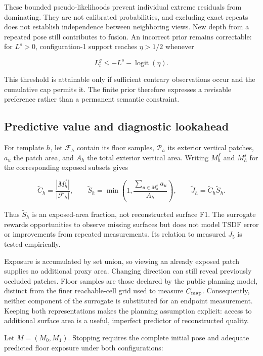 \documentclass[pdflatex,sn-mathphys-num]{sn-jnl}
\begin{document}
These bounded pseudo-likelihoods prevent individual extreme residuals from dominating. They are not calibrated probabilities, and excluding exact repeats does not establish independence between neighboring views. New depth from a repeated pose still contributes to fusion. An incorrect prior remains correctable: for \(L^s>0\), configuration-1 support reaches \(\eta>1/2\) whenever

\[
L_t^g\le-L^s-\operatorname{logit}(\eta).
\]

This threshold is attainable only if sufficient contrary observations occur and the cumulative cap permits it. The finite prior therefore expresses a revisable preference rather than a permanent semantic constraint.

\hypertarget{predictive-value-and-diagnostic-lookahead}{%
\subsection{Predictive value and diagnostic lookahead}\label{predictive-value-and-diagnostic-lookahead}}

For template \(h\), let \(\mathcal F_h\) contain its floor samples, \(\mathcal P_h\) its exterior vertical patches, \(a_u\) the patch area, and \(A_h\) the total exterior vertical area. Writing \(M_h^f\) and \(M_h^s\) for the corresponding exposed subsets gives

\[
\widetilde C_h=\frac{|M_h^f|}{|\mathcal F_h|},\qquad
\widetilde S_h=\min\left(1,\frac{\sum_{u\in M_h^s}a_u}{A_h}\right),\qquad
\widetilde J_h=\widetilde C_h\widetilde S_h.
\]

Thus \(\widetilde S_h\) is an exposed-area fraction, not reconstructed surface F1. The surrogate rewards opportunities to observe missing surfaces but does not model TSDF error or improvements from repeated measurements. Its relation to measured \(J_5\) is tested empirically.

Exposure is accumulated by set union, so viewing an already exposed patch supplies no additional proxy area. Changing direction can still reveal previously occluded patches. Floor samples are those declared by the public planning model, distinct from the finer reachable-cell grid used to measure \(C_{\rm map}\). Consequently, neither component of the surrogate is substituted for an endpoint measurement. Keeping both representations makes the planning assumption explicit: access to additional surface area is a useful, imperfect predictor of reconstructed quality.

Let \(M=(M_0,M_1)\). Stopping requires the complete initial pose and adequate predicted floor exposure under both configurations:
\end{document}
